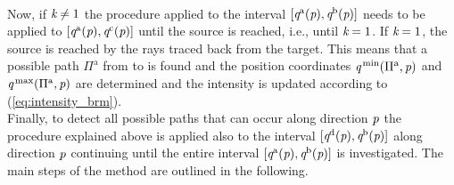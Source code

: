 \\ \indent Now, if $\textit{k}\neq1$ the procedure applied to the interval 
$[\textit{q}^{\textrm{a}}(\textit{p}), \textit{q}^{\textrm{b}}(\textit{p})]$ needs to be applied to $[\textit{q}^{\textrm{a}}(\textit{p}),\textit{q}^{\textrm{c}}(\textit{p})]$ until the source is reached, i.e., until $\textit{k}=1$. If $\textit{k}=1$, the source is reached by the rays traced back from the target. This means that a possible path $\Pi^{\textrm{a}}$ from  to  is found and the position coordinates $\textit{q}^{\textrm{\,min}}(\Pi^{\textrm{a}}, \textit{p})$ and $\textit{q}^{\textrm{\,max}}(\Pi^{\textrm{a}}, \textit{p})$ are determined and the intensity is updated according to (\ref{eq:intensity_brm}).
\\ \indent 
Finally, to detect all possible paths that can occur along direction $\textit{p}$ the procedure explained above is applied also to the interval $[\textit{q}^{\textrm{d}}(\textit{p}), \textit{q}^{\textrm{b}}(\textit{p})]$ along direction $\textit{p}$ continuing until the entire interval $[\textit{q}^{\textrm{a}}(\textit{p}), \textit{q}^{\textrm{b}}(\textit{p})]$ is investigated. 
The main steps of the method are outlined in the following.
